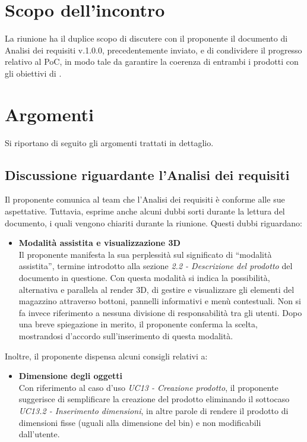 \section{Scopo dell'incontro} \label{sec:scopo}
La riunione ha il duplice scopo di discutere con il proponente il documento di Analisi dei requisiti v.1.0.0, precedentemente inviato, e di condividere il progresso relativo al PoC, in modo tale da garantire la coerenza di entrambi i prodotti con gli obiettivi di \nomeAzienda. 

\section{Argomenti} \label{sec:argomenti}
\noindent Si riportano di seguito gli argomenti trattati in dettaglio.

\subsection{Discussione riguardante l'Analisi dei requisiti} \label{sec:argomenti:analisi}
    Il proponente comunica al team che l'Analisi dei requisiti è conforme alle sue aspettative. 
    Tuttavia, esprime anche alcuni dubbi sorti durante la lettura del documento, i quali vengono chiariti durante la riunione. Questi dubbi riguardano:
    \begin{itemize}
        \item \textbf{Modalità assistita e visualizzazione 3D} \\
        Il proponente manifesta la sua perplessità sul significato di ``modalità assistita'', termine introdotto alla sezione \textit{2.2 - Descrizione del prodotto} del documento in questione. Con questa modalità si indica la possibilità, alternativa e parallela al render 3D, di gestire e visualizzare gli elementi del magazzino attraverso bottoni, pannelli informativi e menù contestuali.
        Non si fa invece riferimento a nessuna divisione di responsabilità tra gli utenti.
        Dopo una breve spiegazione in merito, il proponente conferma la scelta, mostrandosi d'accordo sull'inserimento di questa modalità.
    \end{itemize}
    Inoltre, il proponente dispensa alcuni consigli relativi a:
    \begin{itemize}
        \item \textbf{Dimensione degli oggetti}\\
        Con riferimento al caso d'uso \textit{UC13 - Creazione prodotto}, il proponente suggerisce di semplificare la creazione del prodotto eliminando il sottocaso \textit{UC13.2 - Inserimento dimensioni}, in altre parole di rendere il prodotto di dimensioni fisse (uguali alla dimensione del bin) e non modificabili dall'utente.
    \end{itemize}

